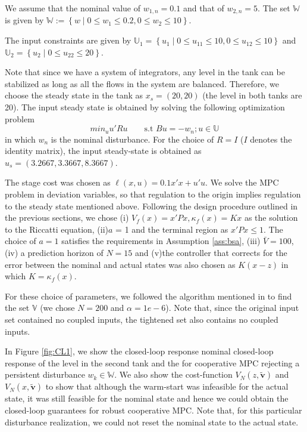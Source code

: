\documentclass[10pt]{article}
\newcommand{\set}[1]{\left\lbrace #1 \right\rbrace}
\theoremstyle{definition}
\begin{document}
We assume that the nominal value of $w_{1,n} = 0.1$ and that of $w_{2,n} =
5$. The set $\mathbb{W}$ is given by $\mathbb{W} := \set{w \mid 0\leq
  w_1\leq 0.2, 0 \leq w_2 \leq 10}$.

The input constraints are given by $\mathbb{U}_1 = \set {u_1 \mid 0
  \leq u_{11} \leq 10, 0 \leq u_{12} \leq 10}$ and $\mathbb{U}_2 =
\set{u_2 \mid 0 \leq u_{22} \leq 20}$.

Note that since we have a system of integrators, any level in the tank
can be stabilized as long as all the flows in the system are
balanced. Therefore, we choose the steady state in the tank as $x_s =
(20,20)$ (the level in both tanks are 20). The input steady state is
obtained by solving the following optimization problem
\[ min_{u}{u'Ru} \qquad \text{s.t~} Bu = -w_n ; u \in \mathbb{U} \]
in which $w_n$ is the nominal disturbance. For the choice of $R = I$
($I$ denotes the identity matrix), the input steady-state is obtained
as $u_s = (3.2667,3.3667,8.3667)$. 

The stage cost was chosen as $\ell(x,u) = 0.1 x'x + u'u$. We solve the
MPC problem in deviation variables, so that regulation to the origin
implies regulation to the steady state mentioned above. Following
the design procedure outlined in the previous sections, we chose 
(i) $V_f(x) = x'Px,\kappa_f(x) = Kx$ as the solution to the Riccatti
equation, 
(ii)$a$ = 1 and the terminal region as $x'Px \leq 1$. The choice of
  $a=1$ satisfies the requirements in Assumption \ref{ass:bsa}, (iii)
$\bar{V} = 100$, (iv) a prediction horizon of $N=15$ and (v)the controller that corrects for the error between the nominal
  and actual states was also chosen as $K(x-z)$ in which $K = \kappa_f(x)$.

For these choice of parameters, we followed the algorithm mentioned in
\citet{rakovic:kerrigan:kouramas:mayne:2003} to find the set
$\mathbb{V}$ (we chose $N=200$ and $\alpha = 1e-6$). Note that, since the original input set contained no
coupled inputs, the tightened set also contains no coupled inputs. 

In Figure \ref{fig:CL1}, we show the closed-loop response 
nominal closed-loop response of the level in the second tank and the for cooperative MPC rejecting a
persistent disturbance $w_k \in \mathbb{W}$.  We also show the cost-function $V_N(z,\tilde{\mathbf{v}})$ and
$V_N(x,\tilde{\mathbf{v}})$ to show that although the warm-start was
infeasible for the actual state, it was still feasible for the nominal
state and hence we could obtain the closed-loop guarantees for robust
cooperative MPC. Note that, for this particular disturbance
realization, we could not reset the nominal state to the actual state.
\end{document}
